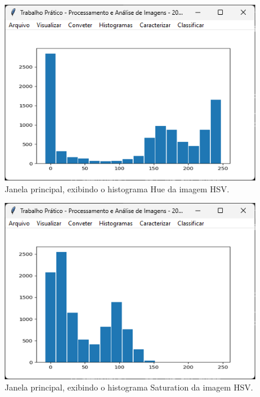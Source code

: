 \documentclass[12pt]{article}
\begin{document}
\begin{figure}
    \centering
    \includegraphics{Captura de tela 2024-06-10 094944.png}
    \caption{Janela principal, exibindo o histograma Hue da imagem HSV.}
    \label{fig:janela-principal-histograma-hue}
\end{figure}

\begin{figure}
    \centering
    \includegraphics{Captura de tela 2024-06-10 095002.png}
    \caption{Janela principal, exibindo o histograma Saturation da imagem HSV.}
    \label{fig:janela-principal-histograma-saturation}
\end{figure}
\end{document}
